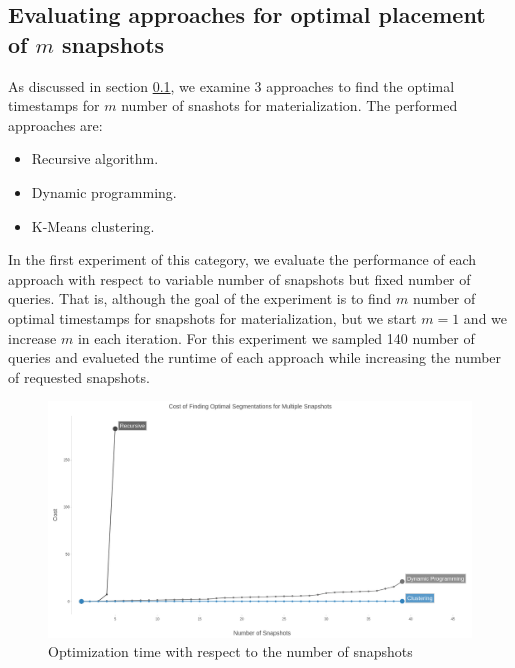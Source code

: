 \subsection{Evaluating approaches for optimal placement of $m$ snapshots}
As discussed in section \ref{}, we examine 3 approaches to find the optimal timestamps for $m$ number of snashots for materialization. The performed approaches are:
\begin{itemize}
	\item Recursive algorithm.
	\item Dynamic programming.
	\item K-Means clustering.
\end{itemize}


In the first experiment of this category, we evaluate the performance of each approach with respect to variable number of snapshots but fixed number of queries. That is, although the goal of the experiment is to find $m$ number of optimal timestamps for snapshots for materialization, but we start $m=1$ and we increase $m$ in each iteration. For this experiment we sampled 140 number of queries and evalueted the runtime of each approach while increasing the number of requested snapshots.

\begin{figure}
	\centering
	\includegraphics[width=\textwidth]{figs/variable_snapshots.jpg}
	\caption{Optimization time with respect to the number of snapshots}
	\label{fig:variable_snapshots}
\end{figure} 


